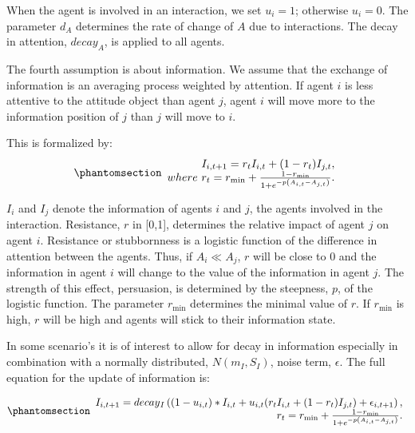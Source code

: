 \documentclass[
  a4paper,
  DIV=11,
  numbers=noendperiod,
  oneside]{scrreprt}
\begin{document}
When the agent is involved in an interaction, we set \(u_{i} = 1\);
otherwise \(u_{i} = 0\). The parameter \(d_{A}\) determines the rate of
change of \(A\) due to interactions. The decay in attention,
\({decay}_A\), is applied to all agents.

The fourth assumption is about information. We assume that the exchange
of information is an averaging process weighted by attention. If agent
\(i\) is less attentive to the attitude object than agent \(j\), agent
\(i\) will move more to the information position of \(j\) than \(j\)
will move to \(i\).

This is formalized by:
\begin{equation}\phantomsection\label{eq-ch7-6-old-55}{\begin{array}{r}
I_{i,t+1}=r_{t}I_{i,t}+(1-r_{t}) I_{j,t},
\\ where\ r_{t} = r_{\min} + \frac{1 - r_{\min}}{1 + e^{- p\left( A_{i,t} - A_{j,t} \right)}}. \\
\end{array}}\end{equation}

\(I_{i}\) and \(I_{j}\) denote the information of agents \(i\) and
\(j\), the agents involved in the interaction. Resistance, \(r\) in
{[}0,1{]}, determines the relative impact of agent \(j\) on agent \(i\).
Resistance or stubbornness is a logistic function of the difference in
attention between the agents. Thus, if \(A_{i} \ll A_{j}\), \(r\) will
be close to 0 and the information in agent \(i\) will change to the
value of the information in agent \(j\). The strength of this effect,
persuasion, is determined by the steepness, \(p\), of the logistic
function. The parameter \(r_{\min}\) determines the minimal value of
\(r\). If \(r_{\min}\) is high, \(r\) will be high and agents will stick
to their information state.

In some scenario's it is of interest to allow for decay in information
especially in combination with a normally distributed,
\(N(m_{I},S_{I})\), noise term, \(\epsilon\). The full equation for the
update of information is:

\begin{equation}\phantomsection\label{eq-ch7-6-old-55b}{\begin{array}{r}
I_{i,t+1}=decay{_I} \left((1-u_{i,t} )*I_{i,t}+u_{i,t} (r_{t}I_{i,t}+(1-r_{t}) I_{j,t})+\epsilon_{i,t+1}\right),
\\ r_{t} = r_{\min} + \frac{1 - r_{\min}}{1 + e^{- p\left( A_{i,t} - A_{j,t} \right)}}. \\
\end{array}}\end{equation}
\end{document}
